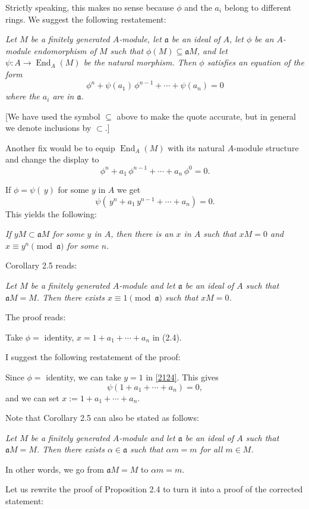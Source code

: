 \documentclass[parskip=half,fontsize=12pt]{scrartcl}%
\newcommand{\oo}{\operatorname}\newcommand{\ooo}{\operatorname*}
\newcommand{\mf}{\mathfrak}
\begin{document}
Strictly speaking, this makes no sense because $\phi$ and the $a_i$ belong to different rings. We suggest the following restatement:

\emph{Let $M$ be a finitely generated $A$-module, let $\mf a$ be an ideal of $A$, let $\phi$ be an $A$-module endomorphism of $M$ such that $\phi(M)\subseteq\mf a M$, and let $\psi:A\to\oo{End}_A(M)$ be the natural morphism. Then $\phi$ satisfies an equation of the form
$$
\phi^n+\psi(a_1)\,\phi^{n-1}+\cdots+\psi(a_n)=0
$$ 
where the $a_i$ are in $\mf a$.}

[We have used the symbol $\subseteq$ above to make the quote accurate, but in general we denote inclusions by $\subset$.]

Another fix would be to equip $\operatorname{End}_A(M)$ with its natural $A$-module structure and change the display to 
$$
\phi^n+a_1\,\phi^{n-1}+\cdots+a_n\,\phi^0=0.
$$

If $\phi=\psi(\,y)$ for some $y$ in $A$ we get 
\begin{equation}\label{2124}
\psi(\,y^n+a_1\,y^{n-1}+\cdots+a_n)=0.
\end{equation}
This yields the following:

\emph{If $yM\subset\mf aM$ for some $y$ in $A$, then there is an $x$ in $A$ such that $xM=0$ and $x\equiv y^n\pmod{\mf a}$ for some $n$.}

Corollary 2.5 reads:

\emph{Let $M$ be a finitely generated $A$-module and let $\mf a$ be an ideal of $A$ such that $\mf aM=M$. Then there exists $x\equiv1\pmod{\mf a}$ such that $xM=0$.}

The proof reads:

Take $\phi=$ identity, $x=1+a_1+\cdots+a_n$ in (2.4).

I suggest the following restatement of the proof:

Since $\phi=$ identity, we can take $y=1$ in \eqref{2124}. This gives 
$$
\psi(1+a_1+\cdots+a_n)=0,
$$ 
and we can set $x:=1+a_1+\cdots+a_n$.

Note that Corollary 2.5 can also be stated as follows:

\emph{Let $M$ be a finitely generated $A$-module and let $\mf a$ be an ideal of $A$ such that $\mf aM=M$. Then there exists $\alpha\in\mf a$ such that $\alpha m=m$ for all $m\in M$.}

In other words, we go from $\mf aM=M$ to $\alpha m=m$.

Let us rewrite the proof of Proposition 2.4 to turn it into a proof of the corrected statement:%
\end{document}
